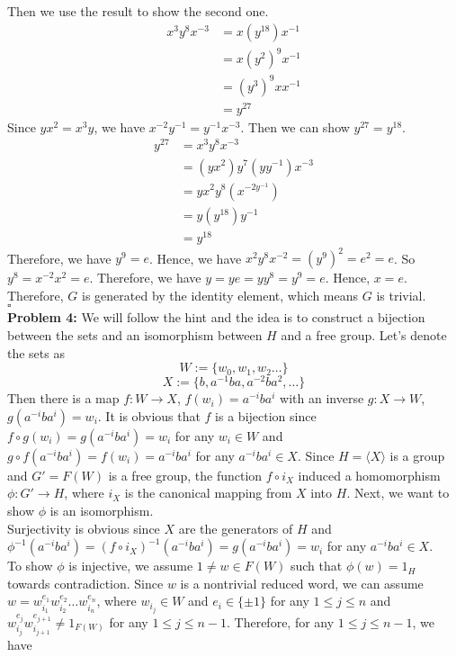 \documentclass[12pt]{amsart}
\begin{document}
Then we use the result to show the second one.
\begin{align*}
    x^3y^8x^{-3}&=x(y^{18})x^{-1}\\
    &=x(y^2)^{9}x^{-1}\\
    &=(y^3)^9xx^{-1}\\
    &=y^{27}
\end{align*}
Since $yx^2=x^3y$, we have $x^{-2}y^{-1}=y^{-1}x^{-3}$. Then we can show $y^{27}=y^{18}$.
\begin{align*}
    y^{27}&=x^{3}y^8x^{-3}\\
    &=(yx^2)y^7(yy^{-1})x^{-3}\\
    &=yx^2y^8(x^{-2y^{-1}})\\
    &=y(y^{18})y^{-1}\\
    &=y^{18}
\end{align*}
Therefore, we have $y^9=e$. Hence, we have $x^2y^8x^{-2}=(y^9)^2=e^2=e$. So $y^8=x^{-2}x^2=e$.
Therefore, we have $y=ye=yy^8=y^9=e$. Hence, $x=e$. Therefore, $G$ is generated by the identity element, which means $G$ is trivial.
\\\phantom{qed}\hfill$\square$\\
\textbf{Problem 4:} We will follow the hint and the idea is to construct a bijection between the sets and an isomorphism between $H$ and a free group. Let's denote the sets as 
\[W:=\{w_0,w_1,w_2\dots\}\]
\[X:=\{b,a^{-1}ba,a^{-2}ba^2,\dots\}\]
Then there is a map $f:W\to X$, $f(w_i)=a^{-i}ba^i$ with an inverse $g:X\to W$, $g(a^{-i}ba^i)=w_i$. It is obvious that $f$ is a bijection since $f\circ g(w_i)=g(a^{-i}ba^i)=w_i$ for any $w_i\in W$ and $g\circ f(a^{-i}ba^i)=f(w_i)=a^{-i}ba^i$ for any $a^{-i}ba^i\in X$. Since $H=\langle X\rangle$ is a group and $G'=F(W)$ is a free group, the function $f\circ i_X$ induced a homomorphism $\phi:G'\rightarrow H$, where $i_X$ is the canonical mapping from $X$ into $H$. Next, we want to show $\phi$ is an isomorphism.\\
Surjectivity is obvious since $X$ are the generators of $H$ and $\phi^{-1}(a^{-i}ba^i)=(f\circ i_X)^{-1}(a^{-i}ba^i)=g(a^{-i}ba^i)=w_i$ for any $a^{-i}ba^i\in X$.\\
To show $\phi$ is injective, we assume $1\neq w\in F(W)$ such that $\phi(w)=1_H$ towards contradiction. Since $w$ is a nontrivial reduced word, we can assume $w=w_{i_1}^{e_1}w_{i_2}^{e_2}\dots w_{i_n}^{e_n}$, where $w_{i_j}\in W$ and $e_i\in\{\pm 1\}$ for any $1\leq j\leq n$ and $w_{i_j}^{e_{j}}w_{i_{j+1}}^{e_{j+1}}\neq 1_{F(W)}$ for any $1\leq j\leq n-1$. Therefore, for any $1\leq j\leq n-1$, we have 
\end{document}
